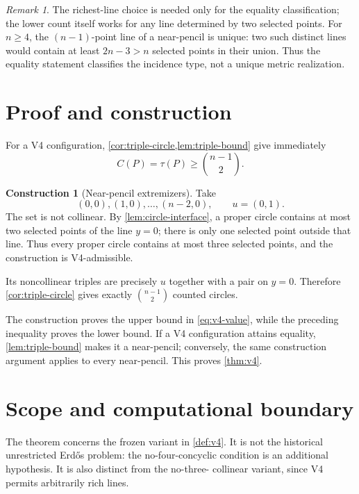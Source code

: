 \documentclass[11pt]{article}
\theoremstyle{definition}
\newtheorem{construction}[theorem]{Construction}
\theoremstyle{remark}
\newtheorem{remark}[theorem]{Remark}
\begin{document}
\begin{remark}\label{rem:equality}
The richest-line choice is needed only for the equality classification;
the lower count itself works for any line determined by two selected
points.  For \(n\ge4\), the \((n-1)\)-point line of a near-pencil is unique:
two such distinct lines would contain at least \(2n-3>n\) selected points
in their union.  Thus the equality statement classifies the incidence
type, not a unique metric realization.
\end{remark}

\section{Proof and construction}

For a V4 configuration, \cref{cor:triple-circle,lem:triple-bound} give
immediately
\[
 C(P)=\tau(P)\ge\binom{n-1}{2}.
\]

\begin{construction}[Near-pencil extremizers]\label{con:near-pencil}
Take
\[
 (0,0),(1,0),\ldots,(n-2,0),\qquad u=(0,1).
\]
The set is not collinear.  By \cref{lem:circle-interface}, a proper circle
contains at most two selected points of the line \(y=0\); there is only one
selected point outside that line.  Thus every proper circle contains at
most three selected points, and the construction is V4-admissible.

Its noncollinear triples are precisely \(u\) together with a pair on
\(y=0\).  Therefore \cref{cor:triple-circle} gives exactly
\(\binom{n-1}{2}\) counted circles.
\end{construction}

The construction proves the upper bound in \eqref{eq:v4-value}, while the
preceding inequality proves the lower bound.  If a V4 configuration attains
equality, \cref{lem:triple-bound} makes it a near-pencil; conversely, the
same construction argument applies to every near-pencil.  This proves
\cref{thm:v4}.

\section{Scope and computational boundary}

The theorem concerns the frozen variant in \cref{def:v4}.  It is not the
historical unrestricted Erd\H{o}s problem: the no-four-concyclic condition
is an additional hypothesis.  It is also distinct from the no-three-
collinear variant, since V4 permits arbitrarily rich lines.
\end{document}

